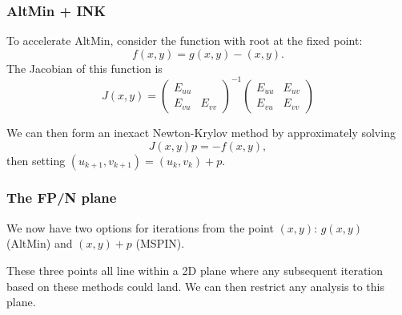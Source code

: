 \documentclass{beamer}
\begin{document}
\begin{frame}
\frametitle{AltMin + INK}

To accelerate AltMin, consider the function with root at the fixed point:
\begin{equation*}
	f(x,y) = g(x,y) - (x,y).
\end{equation*}
The Jacobian of this function is
\begin{equation*}
	J(x,y) = \begin{pmatrix} E_{uu} \\ E_{vu} & E_{vv} \end{pmatrix}^{-1} \begin{pmatrix} E_{uu} & E_{uv} \\ E_{vu} & E_{vv} \end{pmatrix}
\end{equation*}

We can then form an inexact Newton-Krylov method by approximately solving
\begin{equation*}
	J(x,y) p = -f(x,y),
\end{equation*}
then setting $(u_{k+1}, v_{k+1}) = (u_k, v_k) + p$.

\end{frame}

\begin{frame}
\frametitle{The FP/N plane}

We now have two options for iterations from the point $(x,y)$:
$g(x,y)$ (AltMin) and $(x,y) + p$ (MSPIN).

These three points all line within a 2D plane where any subsequent iteration based on these methods could land.
We can then restrict any analysis to this plane.

		\begin{figure}
		\end{figure}
\end{frame}
\end{document}
